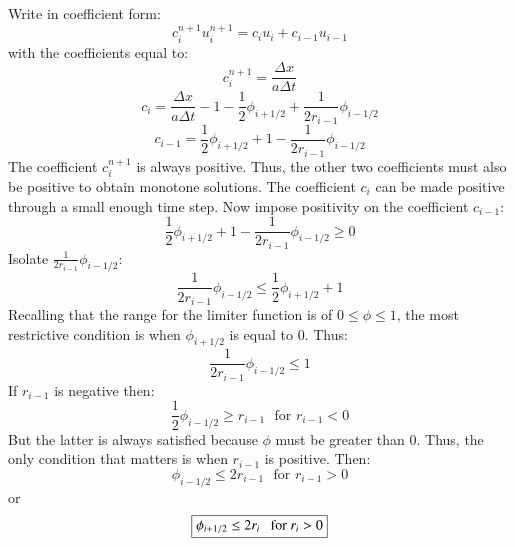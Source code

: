 \documentclass{warpdoc}
\newcommand\frameeqn[1]{\fbox{$\displaystyle #1$}}
\begin{document}
%
Write in coefficient form:
%
\begin{equation}
c_i^{n+1} u^{n+1}_i = 
  c_i u_i  
+ c_{i-1} u_{i-1}
\end{equation}
%
with the coefficients equal to:
%
\begin{equation}
c_i^{n+1}=\frac{\Delta x}{a\Delta t}
\end{equation}
%
%
\begin{equation}
c_i=\frac{\Delta x}{a\Delta t} - 1 - \frac{1}{2} \phi_{i+1/2} + \frac{1}{2 r_{i-1}} \phi_{i-1/2} 
\end{equation}
%
%
\begin{equation}
c_{i-1}=\frac{1}{2} \phi_{i+1/2} +1 - \frac{1}{2 r_{i-1}} \phi_{i-1/2} 
\end{equation}
%
The coefficient $c_i^{n+1}$ is always positive. Thus, the other two coefficients must also be positive to obtain monotone solutions. The coefficient $c_i$ can be made positive through a small enough time step. Now impose positivity on the coefficient $c_{i-1}$:
%
\begin{equation}
\frac{1}{2} \phi_{i+1/2} +1 - \frac{1}{2 r_{i-1}} \phi_{i-1/2}  \ge 0
\end{equation}
%
Isolate $\frac{1}{2 r_{i-1}} \phi_{i-1/2} $:
%
\begin{equation}
\frac{1}{2 r_{i-1}} \phi_{i-1/2}  \le \frac{1}{2} \phi_{i+1/2} +1 
\end{equation}
%
Recalling that the range for the limiter function is of $0 \le \phi \le 1$, the most restrictive condition is when $\phi_{i+1/2}$ is equal to 0. Thus:
%
\begin{equation}
\frac{1}{2 r_{i-1}} \phi_{i-1/2}  \le 1 
\end{equation}
%
If $r_{i-1}$ is negative then:
%
\begin{equation}
\frac{1}{2} \phi_{i-1/2}  \ge r_{i-1} ~~~\textrm{for }r_{i-1}<0 
\end{equation}
%
But the latter is always satisfied because $\phi$ must be greater than 0. Thus, the only condition that matters is when $r_{i-1}$ is positive. Then:
%
\begin{equation}
\phi_{i-1/2}  \le 2 r_{i-1} ~~~\textrm{for }r_{i-1}>0
\end{equation}
%
or
%
\begin{equation}
\frameeqn{
\phi_{i+1/2}  \le 2 r_{i} ~~~\textrm{for }r_{i}>0
}
\label{eqn:positive_condition_2o}
\end{equation}
%
\end{document}
